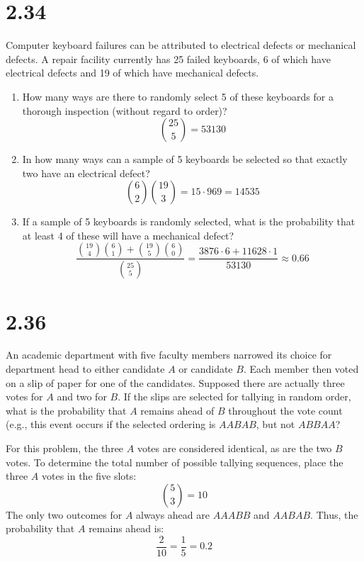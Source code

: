 \documentclass[letterpaper,12pt,fleqn]{article}
\begin{document}
\bigskip

\section*{2.34}

Computer keyboard failures can be attributed to electrical defects or mechanical defects.  A repair facility currently has
25 failed keyboards, 6 of which have electrical defects and 19 of which have mechanical defects.
\begin{enumerate}[label=\alph*)]
\item How many ways are there to randomly select 5 of these keyboards for a thorough inspection (without regard to order)?
  \[\binom{25}{5}=53130\]

\item In how many ways can a sample of 5 keyboards be selected so that exactly two have an electrical defect?
  \[\binom{6}{2}\binom{19}{3}=15\cdot969=14535\]

\item If a sample of 5 keyboards is randomly selected, what is the probability that at least 4 of these will have a
  mechanical defect?
  \[\frac{\binom{19}{4}\binom{6}{1}+\binom{19}{5}\binom{6}{0}}{\binom{25}{5}}=
  \frac{3876\cdot6+11628\cdot1}{53130}\approx0.66\]
\end{enumerate}

\bigskip

\section*{2.36}

An academic department with five faculty members narrowed its choice for department head to either candidate \(A\) or
candidate \(B\).  Each member then voted on a slip of paper for one of the candidates.  Supposed there are actually three
votes for \(A\) and two for \(B\).  If the slips are selected for tallying in random order, what is the probability that
\(A\) remains ahead of \(B\) throughout the vote count (e.g., this event occurs if the selected ordering is \(AABAB\), but
not \(ABBAA\)?

For this problem, the three \(A\) votes are considered identical, as are the two \(B\) votes.  To determine the total
number of possible tallying sequences, place the three \(A\) votes in the five slots:
\[\binom{5}{3}=10\]
The only two outcomes for \(A\) always ahead are \(AAABB\) and \(AABAB\).  Thus, the probability that \(A\) remains ahead is:
\[\frac{2}{10}=\frac{1}{5}=0.2\]
\end{document}
